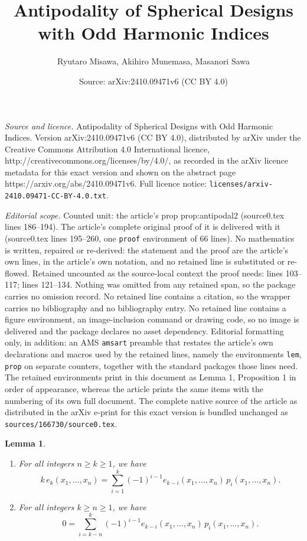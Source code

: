 \documentclass[10pt,a4paper]{amsart}
\title{Antipodality of Spherical Designs with Odd Harmonic Indices}
\author{Ryutaro Misawa, Akihiro Munemasa, Masanori Sawa}
\date{Source: arXiv:2410.09471v6 (CC BY 4.0)}
\newtheorem{lem}{Lemma}
\begin{document}
\maketitle

\noindent\emph{Source and licence.} Antipodality of Spherical Designs with Odd Harmonic Indices. Version arXiv:2410.09471v6 (CC BY 4.0), distributed by arXiv under the Creative Commons Attribution 4.0 International licence, http://creativecommons.org/licenses/by/4.0/, as recorded in the arXiv licence metadata for this exact version and shown on the abstract page https://arxiv.org/abs/2410.09471v6. Full licence notice: \texttt{licenses/arxiv-2410.09471-CC-BY-4.0.txt}.\par\smallskip

\noindent\textit{Editorial scope.} Counted unit: the article's prop prop:antipodal2 (source0.tex lines 186--194). The article's complete original proof of it is delivered with it (source0.tex lines 195--260, one \texttt{proof} environment of 66 lines). No mathematics is written, repaired or re-derived: the statement and the proof are the article's own lines, in the article's own notation, and no retained line is substituted or re-flowed.  Retained uncounted as the source-local context the proof needs: lines 103--117; lines 121--134.  Nothing was omitted from any retained span, so the package carries no omission record.  No retained line contains a citation, so the wrapper carries no bibliography and no bibliography entry.  No retained line contains a figure environment, an image-inclusion command or drawing code, so no image is delivered and the package declares no asset dependency.  Editorial formatting only, in addition: an AMS \texttt{amsart} preamble that restates the article's own declarations and macros used by the retained lines, namely the environments \texttt{lem}, \texttt{prop} on separate counters, together with the standard packages those lines need.  The retained environments print in this document as Lemma 1, Proposition 1 in order of appearance, whereas the article prints the same items with the numbering of its own full document.  The complete native source of the article as distributed in the arXiv e-print for this exact version is bundled unchanged as \texttt{sources/166730/source0.tex}.
\begin{lem}
\label{lem:Newton}
\begin{enumerate}
\item\label{Ni1} 
For all integers \( n \ge k \ge 1 \), we have
\[
k\, e_k(x_1,\ldots,x_n) = \sum_{i=1}^k (-1)^{i-1} e_{k-i}(x_1,\ldots,x_n) \, p_i(x_1,\ldots,x_n).
\]
\item\label{Ni2} 
For all integers \( k \ge n \ge 1 \), we have
\[
0 = \sum_{i=k-n}^k (-1)^{i-1} e_{k-i}(x_1,\ldots,x_n) \, p_i(x_1,\ldots,x_n).
\]
\end{enumerate}
\end{lem}
\end{document}
